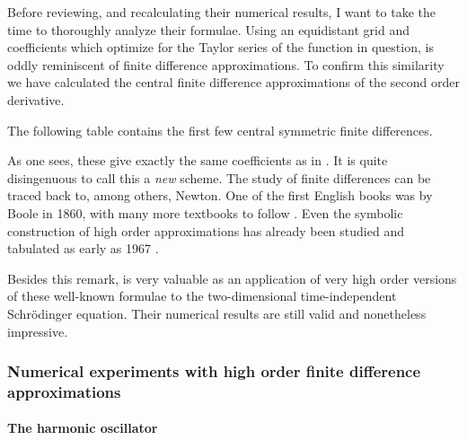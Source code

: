 Before reviewing, and recalculating their numerical results, I want to take the time to thoroughly analyze their formulae. Using an equidistant grid and coefficients which optimize for the Taylor series of the function in question, is oddly reminiscent of finite difference approximations. To confirm this similarity we have calculated the central finite difference approximations of the second order derivative.

The following table contains the first few central symmetric finite differences.
\begin{center}
    
\end{center}

As one sees, these give exactly the same coefficients as in \cite{wang_new_2009}. It is quite disingenuous to call this a \emph{new} scheme. The study of finite differences can be traced back to, among others, Newton. One of the first English books was by Boole \cite{boole_calculus_1860} in 1860, with many more textbooks to follow \cite{thomson_calculus_1933,jordan_calculus_1965}. Even the symbolic construction of high order approximations has already been studied and tabulated as early as 1967 \cite{ballester_construction_1967,keller_symbolic_1978,fornberg_generation_1988}.

Besides this remark, \cite{wang_new_2009} is very valuable as an application of very high order versions of these well-known formulae to the two-dimensional time-independent Schrödinger equation. Their numerical results are still valid and nonetheless impressive.

\subsubsection{Numerical experiments with high order finite difference approximations}\label{sec:c4_fd_numerical}

\paragraph{The harmonic oscillator}

